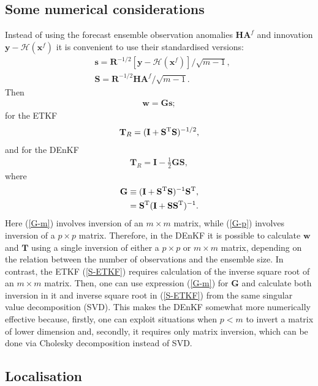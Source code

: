\documentclass[11pt]{report}
\newcommand{\mb} {\mathbf}
\newcommand{\T}{^{\tiny \mathrm T}}
\begin{document}
\subsection{Some numerical considerations}
\label{sec:numerical}

Instead of using the forecast ensemble observation anomalies $\mb H \mb A^f$ and innovation $\mb y - \mathcal H(\mb x^f)$ it is convenient to use their standardised versions:
\begin{align}
  \label{s}
  &\mb s = \mb R^{-1/2} \left[ \mb y - \mathcal H(\mb x^f) \right] / \sqrt{m - 1},\\
  \label{S}
  &\mb S = \mb R^{-1/2} \mb H \mb A^f / \sqrt{m - 1}.
\end{align}
Then
\begin{align}
  \mb w = \mb G \mb s;
\end{align}
for the ETKF
\begin{align}
  \label{S-ETKF}
  \mb T_R = (\mb I + \mb S\T \mb S)^{-1/2},
\end{align}
and for the DEnKF
\begin{align}
  \label{S-DEnKF}
  \mb T_R = \mb I - \frac{1}{2} \mb G \mb S,
\end{align}
where
\begin{align}
  \label{G-m}
  \mb G &\equiv (\mb I + \mb S\T \mb S)^{-1} \mb S\T,\\
  \label{G-p}
  & = \mb S\T ( \mb I + \mb S \mb S\T)^{-1}.
\end{align}
Here (\ref{G-m}) involves inversion of an $m \times m$ matrix, while (\ref{G-p}) involves inversion of a $p \times p$ matrix.
Therefore, in the DEnKF it is possible to calculate $\mb w$ and $\mb T$ using a single inversion of either a $p \times p$ or $m \times m$ matrix, depending on the relation between the number of observations and the ensemble size.
In contrast, the ETKF (\ref{S-ETKF}) requires calculation of the inverse square root of an $m \times m$ matrix.
Then, one can use expression (\ref{G-m}) for $\mb G$ and calculate both inversion in it and inverse square root in (\ref{S-ETKF}) from the same singular value decomposition (SVD).
This makes the DEnKF somewhat more numerically effective because, firstly, one can exploit situations when $p < m$ to invert a matrix of lower dimension and, secondly, it requires only matrix inversion, which can be done via Cholesky decomposition instead of SVD.

\subsection{Localisation}
\end{document}
